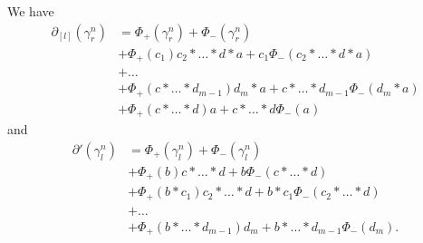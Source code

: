 \documentclass[11pt]{amsart}
\makeatletter
\renewenvironment{proof}[1][\proofname] {\par\pushQED{\qed}{\normalfont\bfseries\topsep6\p@\@plus6\p@\relax #1\@addpunct{.} }}{\popQED\endtrivlist\@endpefalse}
\theoremstyle{mystyle}
\newcommand{\<}{\langle}
\renewcommand{\>}{\rangle}
\makeatother
\begin{document}
\begin{proof}
     We have \begin{align*}
        \partial_{[l]}(\gamma_r^n) &= \Phi_+(\gamma_r^n) + \Phi_-(\gamma_r^n) \\
        &+ \Phi_+(c_1) c_2 * \dots  * d * a + c_1\Phi_-(c_2 * \dots  * d * a) \\
        &+ \ldots \\
        &+ \Phi_+(c * \dots  * d_{m-1}) d_m * a + c * \dots  * d_{m-1} \Phi_-(d_m * a) \\
        &+ \Phi_+(c * \dots  * d)a + c * \dots  * d \Phi_-(a)
    \end{align*} and \begin{align*}
        \partial'(\gamma_l^n) &= \Phi_+(\gamma_l^n) + \Phi_-(\gamma_l^n) \\
        &+ \Phi_+(b) c * \dots  * d + b\Phi_-(c * \dots  * d) \\
        &+ \Phi_+(b * c_1) c_2 * \dots  * d + b*c_1 \Phi_-(c_2 * \dots  * d) \\
        &+ \ldots \\
        &+ \Phi_+(b * \dots  * d_{m-1}) d_m + b * \dots  * d_{m-1} \Phi_-(d_m).
    \end{align*}


\end{proof}
\end{document}
